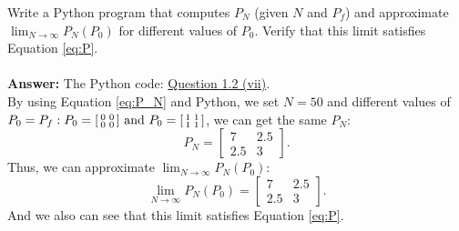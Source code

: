 \documentclass[a4paper,11pt,reqno]{amsart}
\begin{document}
Write a Python program that computes $P_N$ (given $N$ and $P_f$) and approximate $\lim_{N\to \infty}P_N(P_0)$ for
different values of $P_0$. Verify that this limit satisfies Equation \eqref{eq:P}.
\\ \\
\textbf{Answer:} 
The Python code: \href{https://github.com/Gczmy/ELE8088/blob/main/Coursework1/Python_code/2_vii.py}{Question 1.2 (vii)}.
\\
By using Equation \eqref{eq:P_N} and Python, we set $N=50$ and different values of $P_0=P_f:P_0=\begin{bsmallmatrix}0&0\\0&0\end{bsmallmatrix}\text{ and }P_0=\begin{bsmallmatrix}1&1\\1&1\end{bsmallmatrix}$, we can get the same $P_N$:
\begin{equation}
    P_N=
    \begin{bmatrix}
        7&2.5\\
        2.5&3
    \end{bmatrix}.
\end{equation}
Thus, we can approximate $\lim_{N\to \infty}P_N(P_0)$:
\begin{equation}
    \lim_{N\to \infty}P_N(P_0)=
    \begin{bmatrix}
        7&2.5\\
        2.5&3
    \end{bmatrix}.
\end{equation}
And we also can see that this limit satisfies Equation \eqref{eq:P}.

\end{document}
